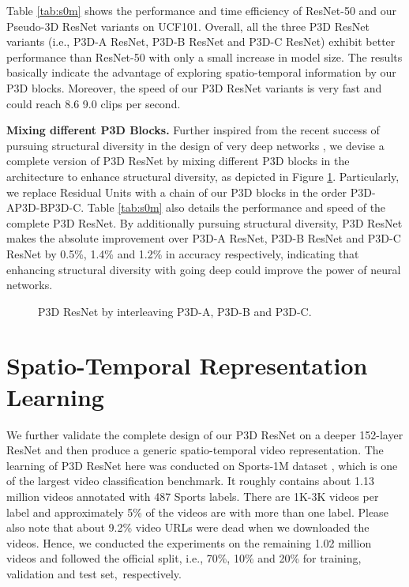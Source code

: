 \documentclass[10pt,twocolumn,letterpaper]{article}
\begin{document}
Table \ref{tab:s0m} shows the performance and time efficiency of ResNet-50 and our Pseudo-3D ResNet variants on UCF101. Overall, all the three P3D ResNet variants (i.e., P3D-A ResNet, P3D-B ResNet and P3D-C ResNet) exhibit better performance than ResNet-50 with only a small increase in model size. The results basically indicate the advantage of exploring spatio-temporal information by our P3D blocks. Moreover, the speed of our P3D ResNet variants is very fast and could reach 8.6  9.0 clips per second.



\textbf{Mixing different P3D Blocks.}
Further inspired from the recent success of pursuing structural diversity in the design of very deep networks \cite{zhang2016polynet}, we devise a complete version of P3D ResNet by mixing different P3D blocks in the architecture to enhance structural diversity, as depicted in Figure \ref{fig:fig6}. Particularly, we replace Residual Units with a chain of our P3D blocks in the order P3D-AP3D-BP3D-C. Table \ref{tab:s0m} also details the performance and speed of the complete P3D ResNet. By additionally pursuing structural diversity, P3D ResNet makes the absolute improvement over P3D-A ResNet, P3D-B ResNet and P3D-C ResNet by 0.5\%, 1.4\% and 1.2\% in accuracy respectively, indicating that enhancing structural diversity with going deep could improve the power of neural networks.

\begin{figure}[!tb]
   \caption{\small P3D ResNet by interleaving P3D-A, P3D-B and P3D-C.}
   \label{fig:fig6}
   \vspace{-0.18in}
\end{figure}




\section{Spatio-Temporal Representation Learning}
We further validate the complete design of our P3D ResNet on a deeper 152-layer ResNet \cite{he2015deep} and then produce a generic spatio-temporal video representation. The learning of P3D ResNet here was conducted on Sports-1M dataset \cite{karpathy2014large}, which is one of the largest video classification benchmark. It roughly contains about 1.13 million videos annotated with 487 Sports labels. There are 1K-3K videos per label and approximately 5\% of the videos are with more than one label. Please also note that about 9.2\% video URLs were dead when we downloaded the videos. Hence, we conducted the experiments on the remaining 1.02 million videos and followed the official split, i.e., 70\%, 10\% and 20\% for training, validation and test set,~respectively.
\end{document}
